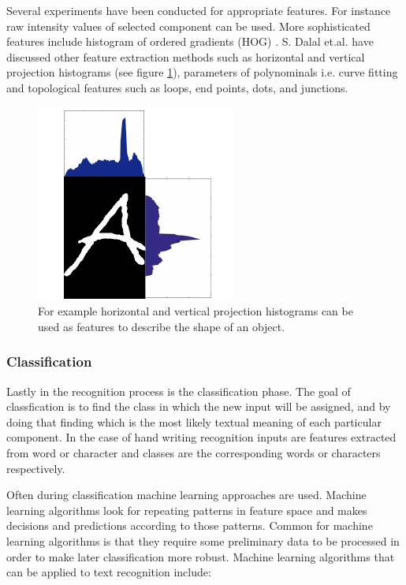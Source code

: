 \documentclass{article}
\begin{document}
        Several experiments have been conducted for appropriate features. For instance raw intensity values of selected component can be used. More sophisticated features include histogram of ordered gradients (HOG) \cite{Dalal2005}. S. Dalal et.al. have discussed other feature extraction methods such as horizontal and vertical projection histograms (see figure \ref{fig:feature}), parameters of polynominals i.e. curve fitting and topological features such as loops, end points, dots, and junctions. \cite{Dalal}

        \begin{figure}
          \centering
          \includegraphics[natwidth=248,natheight=245,scale = 0.6]{feature_extraction.png}
          \caption{For example horizontal and vertical projection histograms can be used as features to describe the shape of an object.\label{fig:feature}}
        \end{figure}

      \subsubsection{Classification}
        Lastly in the recognition process is the classification phase. The goal of classfication is to find the class in which the new input will be assigned, and by doing that finding which is the most likely textual meaning of each particular component. In the case of hand writing recognition inputs are features extracted from word or character and classes are the corresponding words or characters respectively.

        Often during classification machine learning approaches are used. Machine learning algorithms look for repeating patterns in feature space and makes decisions and predictions according to those patterns. Common for machine learning algorithms is that they require some preliminary data to be processed in order to make later classification more robust. Machine learning algorithms that can be applied to text recognition include:
\end{document}
